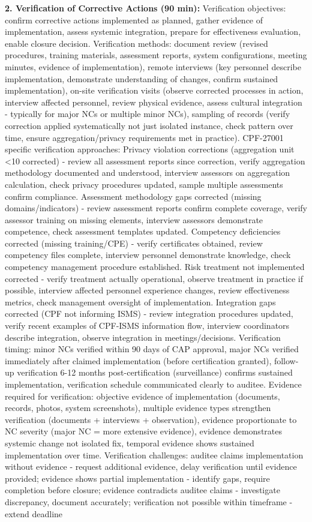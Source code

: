 \documentclass[11pt,a4paper]{article}
\begin{document}
\textbf{2. Verification of Corrective Actions (90 min):} Verification objectives: confirm corrective actions implemented as planned, gather evidence of implementation, assess systemic integration, prepare for effectiveness evaluation, enable closure decision. Verification methods: document review (revised procedures, training materials, assessment reports, system configurations, meeting minutes, evidence of implementation), remote interviews (key personnel describe implementation, demonstrate understanding of changes, confirm sustained implementation), on-site verification visits (observe corrected processes in action, interview affected personnel, review physical evidence, assess cultural integration - typically for major NCs or multiple minor NCs), sampling of records (verify correction applied systematically not just isolated instance, check pattern over time, ensure aggregation/privacy requirements met in practice). CPF-27001 specific verification approaches: Privacy violation corrections (aggregation unit <10 corrected) - review all assessment reports since correction, verify aggregation methodology documented and understood, interview assessors on aggregation calculation, check privacy procedures updated, sample multiple assessments confirm compliance. Assessment methodology gaps corrected (missing domains/indicators) - review assessment reports confirm complete coverage, verify assessor training on missing elements, interview assessors demonstrate competence, check assessment templates updated. Competency deficiencies corrected (missing training/CPE) - verify certificates obtained, review competency files complete, interview personnel demonstrate knowledge, check competency management procedure established. Risk treatment not implemented corrected - verify treatment actually operational, observe treatment in practice if possible, interview affected personnel experience changes, review effectiveness metrics, check management oversight of implementation. Integration gaps corrected (CPF not informing ISMS) - review integration procedures updated, verify recent examples of CPF-ISMS information flow, interview coordinators describe integration, observe integration in meetings/decisions. Verification timing: minor NCs verified within 90 days of CAP approval, major NCs verified immediately after claimed implementation (before certification granted), follow-up verification 6-12 months post-certification (surveillance) confirms sustained implementation, verification schedule communicated clearly to auditee. Evidence required for verification: objective evidence of implementation (documents, records, photos, system screenshots), multiple evidence types strengthen verification (documents + interviews + observation), evidence proportionate to NC severity (major NC = more extensive evidence), evidence demonstrates systemic change not isolated fix, temporal evidence shows sustained implementation over time. Verification challenges: auditee claims implementation without evidence - request additional evidence, delay verification until evidence provided; evidence shows partial implementation - identify gaps, require completion before closure; evidence contradicts auditee claims - investigate discrepancy, document accurately; verification not possible within timeframe - extend deadline 
\end{document}
